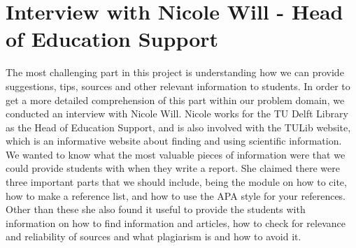 \section{Interview with Nicole Will - Head of Education Support}
 The most challenging part in this project is understanding how we can provide suggestions, tips, sources and other relevant information to students. In order to get a more detailed comprehension of this part within our problem domain, we conducted an interview with Nicole Will. Nicole works for the TU Delft Library as the Head of Education Support, and is also involved with the TULib website, which is an informative website about finding and using scientific information.
We wanted to know what the most valuable pieces of information were that we could provide students with when they write a report. She claimed there were three important parts that we should include, being the module on how to cite\cite{tulib:howtocite}, how to make a reference list, and how to use the APA\cite{tulib:apa} style for your references.
Other than these she also found it useful to provide the students with information on how to find information and articles, how to check for relevance and reliability of sources and what plagiarism is and how to avoid it.